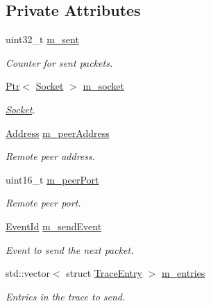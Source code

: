 \subsection*{Private Attributes}
\begin{DoxyCompactItemize}
\item 
uint32\+\_\+t \hyperlink{structns3_1_1UdpTraceClient_a226ae5b31c9f4777726bc6cc188c6a85}{m\+\_\+sent}
\begin{DoxyCompactList}\small\item\em Counter for sent packets. \end{DoxyCompactList}\item 
\hyperlink{classns3_1_1Ptr}{Ptr}$<$ \hyperlink{classns3_1_1Socket}{Socket} $>$ \hyperlink{structns3_1_1UdpTraceClient_afdf8d1c4e4d20f4a378eb92ccf5a34d1}{m\+\_\+socket}
\begin{DoxyCompactList}\small\item\em \hyperlink{classns3_1_1Socket}{Socket}. \end{DoxyCompactList}\item 
\hyperlink{classns3_1_1Address}{Address} \hyperlink{structns3_1_1UdpTraceClient_a23963b5603afc628e516eb1eccb14ad8}{m\+\_\+peer\+Address}
\begin{DoxyCompactList}\small\item\em Remote peer address. \end{DoxyCompactList}\item 
uint16\+\_\+t \hyperlink{structns3_1_1UdpTraceClient_a218996a58ca6cb1a17edd8df252596f5}{m\+\_\+peer\+Port}
\begin{DoxyCompactList}\small\item\em Remote peer port. \end{DoxyCompactList}\item 
\hyperlink{classns3_1_1EventId}{Event\+Id} \hyperlink{structns3_1_1UdpTraceClient_a0190e0401d6d08774bdf89ccc4799a28}{m\+\_\+send\+Event}
\begin{DoxyCompactList}\small\item\em Event to send the next packet. \end{DoxyCompactList}\item 
std\+::vector$<$ struct \hyperlink{structns3_1_1UdpTraceClient_1_1TraceEntry}{Trace\+Entry} $>$ \hyperlink{structns3_1_1UdpTraceClient_a70572bdca03573bfb7fe51552f2ea28a}{m\+\_\+entries}
\begin{DoxyCompactList}\small\item\em Entries in the trace to send. \end{DoxyCompactList}\item 

\end{DoxyCompactItemize}
